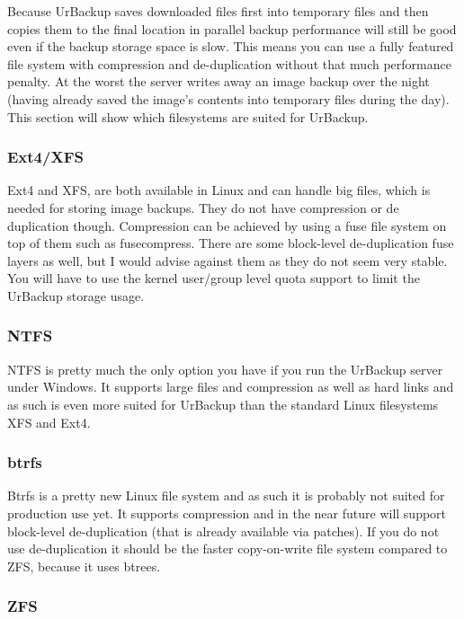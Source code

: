 \documentclass[a4paper,10pt]{article} \usepackage[breaklinks=true]{hyperref}
\begin{document}
Because UrBackup saves downloaded files first into temporary files and then copies them to the final location in parallel backup performance will still be good even if the backup storage space is slow. This means you can use a fully featured file system with compression and de-duplication without that much performance penalty. At the worst the server writes away an image backup over the night (having already saved the image's contents into temporary files during the day). This section will show which filesystems are suited for UrBackup.

\subsubsection{Ext4/XFS}

Ext4 and XFS, are both available in Linux and can handle big files, which is needed for storing image backups. They do not have compression or de duplication though. Compression can be achieved by using a fuse file system on top of them such as fusecompress. There are some block-level de-duplication fuse layers as well, but I would advise against them as they do not seem very stable. You will have to use the kernel user/group level quota support to limit the UrBackup storage usage.

\subsubsection{NTFS}

NTFS is pretty much the only option you have if you run the UrBackup server under Windows. It supports large files and compression as well as hard links and as such is even more suited for UrBackup than the standard Linux filesystems XFS and Ext4. 

\subsubsection{btrfs}

Btrfs is a pretty new Linux file system and as such it is probably not suited for production use yet. It supports compression and in the near future will support block-level de-duplication (that is already available via patches). If you do not use de-duplication it should be the faster copy-on-write file system compared to ZFS, because it uses btrees.

\subsubsection{ZFS}
\end{document}
